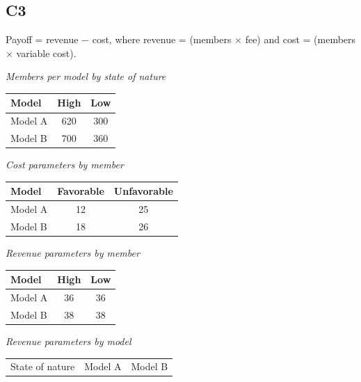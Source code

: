 \begin{ExamProblems}
		\subsection*{C3}
		Payoff = revenue $-$ cost, where revenue = (members $\times$ fee) and cost = (members $\times$ variable cost).

		\begin{center}
			\textit{Members per model by state of nature}\\
			\begin{tabular}{l c c}
				\toprule
				Model & High & Low \\
				\midrule
				Model A & 620 & 300 \\
				Model B & 700 & 360 \\
				\bottomrule
		\end{tabular}
		\end{center}
		\begin{center}
			\begin{minipage}[t]{0.48\linewidth}
				\textit{Cost parameters by member}
				\begin{center}
					\begin{tabular}{l c c}
						\toprule
						Model & Favorable & Unfavorable \\
						\midrule
						Model A & 12 & 25 \\
						Model B & 18 & 26 \\
						\bottomrule
					\end{tabular}
				\end{center}
			\end{minipage}
			\hfill
			\begin{minipage}[t]{0.48\linewidth}
				\textit{Revenue parameters by member}
				\begin{center}
					\begin{tabular}{l c c}
						\toprule
						Model & High & Low \\
						\midrule
						Model A & 36 & 36 \\
						Model B & 38 & 38 \\
						\bottomrule
					\end{tabular}
				\end{center}
			\end{minipage}
		\end{center}
		\begin{center}
			\textit{Revenue parameters by model} \\
			\begin{tabular}{l c c}
				\toprule
				State of nature & Model A & Model B \\

\end{tabular}
\end{center}
\end{ExamProblems}
